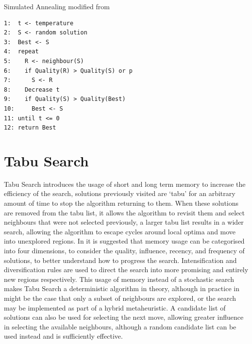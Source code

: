 \documentclass[]{final_report}
\begin{document}
Simulated Annealing modified from \cite{luke:2013}

\begin{verbatim}
1:  t <- temperature
2:  S <- random solution
3:  Best <- S
4:  repeat
5:    R <- neighbour(S)
6:    if Quality(R) > Quality(S) or p
7:      S <- R
8:    Decrease t
9:    if Quality(S) > Quality(Best)
10:     Best <- S
11: until t <= 0
12: return Best
\end{verbatim}

\newpage
\section*{Tabu Search}

Tabu Search introduces the usage of short and long term memory to increase the efficiency of the search, solutions previously visited are `tabu' for an arbitrary amount of time to stop the algorithm returning to them. When these solutions are removed from the tabu list, it allows the algorithm to revisit them and select neighbours that were not selected previously, a larger tabu list results in a wider search, allowing the algorithm to escape cycles around local optima and move into unexplored regions. In \cite{glover:1999} it is suggested that memory usage can be categorised into four dimensions, to consider the quality, influence, recency, and frequency of solutions, to better understand how to progress the search. Intensification and diversification rules are used to direct the search into more promising and entirely new regions respectively. This usage of memory instead of a stochastic search makes Tabu Search a deterministic algorithm in theory, although in practice in might be the case that only a subset of neighbours are explored, or the search may be implemented as part of a hybrid metaheuristic. A candidate list of solutions can also be used for selecting the next move, allowing greater influence in selecting the available neighbours, although a random candidate list can be used instead and is sufficiently effective.
\end{document}
